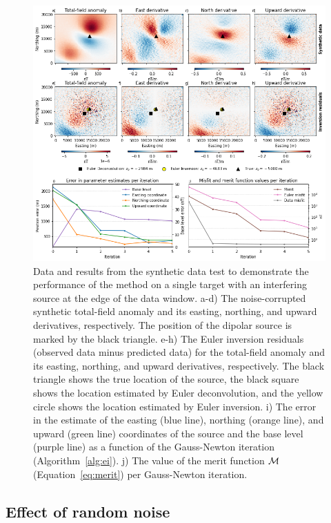 \begin{figure}[tb!]
\centering
\includegraphics[width=1\linewidth]{figures/synthetic-proof-of-concept.png}
\caption{
    Data and results from the synthetic data test to demonstrate the performance of the method on a single target with an interfering source at the edge of the data window. 
    a-d) The noise-corrupted synthetic total-field anomaly and its easting, northing, and upward derivatives, respectively. The position of the dipolar source is marked by the black triangle.
    e-h) The Euler inversion residuals (observed data minus predicted data) for the total-field anomaly and its easting, northing, and upward derivatives, respectively. The black triangle shows the true location of the source, the black square shows the location estimated by Euler deconvolution, and the yellow circle shows the location estimated by Euler inversion.
    i) The error in the estimate of the easting (blue line), northing (orange line), and upward (green line) coordinates of the source and the base level (purple line) as a function of the Gauss-Newton iteration (Algorithm~\ref{alg:ei}).
    j) The value of the merit function $\operatorname{\mathcal{M}}$ (Equation~\ref{eq:merit}) per Gauss-Newton iteration.
}
\label{fig:proof}
\end{figure}


\subsection{Effect of random noise}

